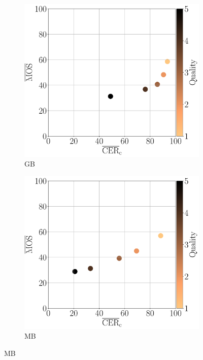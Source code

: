 \begin{figure}[h!]
\begin{subfigure}[b]{0.3\textwidth}
        \includegraphics[width=\textwidth]{../../images/analyze/mos_cer_ref_mean_ezocr_GB.pdf}
        \caption{GB}
        \label{fig:mos_cer_ref_mean_ezocr_GB}
    \end{subfigure}
    \hfill
    \begin{subfigure}[b]{0.3\textwidth}
        \includegraphics[width=\textwidth]{../../images/analyze/mos_cer_ref_mean_ezocr_MB.pdf}
        \caption{MB}
        \label{fig:mos_cer_ref_mean_ezocr_MB}

\end{subfigure}
\end{figure}
